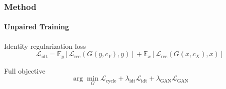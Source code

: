 \begin{frame}
\frametitle{Method}
\framesubtitle{Unpaired Training}
\begin{block}{Identity regularization loss}
    \begin{equation}
        \mathcal{L} _{\text{idt}} = \mathbb{E} _y [ \mathcal{L}_{\text{rec}}(G(y,c_Y),y)] + \mathbb{E}_x [ \mathcal{L}_{\text{rec}}(G(x,c_X),x)]
    \end{equation}
\end{block}


\begin{block}{Full objective}
    \begin{equation}
        \arg \underset{G}{\min} \mathcal{L}_{\text{cycle}} + \lambda _{\text{idt}} \mathcal{L}_{\text{idt}} + \lambda_{\text{GAN}}\mathcal{L}_{\text{GAN}}
    \end{equation}
\end{block}
\end{frame}


